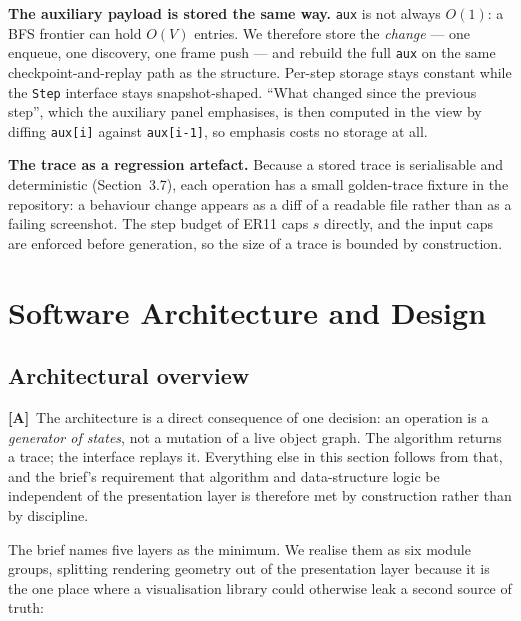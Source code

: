 \documentclass[11pt,a4paper]{article}
\newcommand{\A}{\textcolor{asmc}{\textbf{[A]}}}     %
\newcommand{\ct}[1]{\texttt{#1}}
\begin{document}
\smallskip
\noindent\textbf{The auxiliary payload is stored the same way.} \ct{aux} is not always $O(1)$: a
BFS frontier can hold $O(V)$ entries. We therefore store the \emph{change} --- one enqueue, one
discovery, one frame push --- and rebuild the full \ct{aux} on the same checkpoint-and-replay path
as the structure. Per-step storage stays constant while the \ct{Step} interface stays
snapshot-shaped. ``What changed since the previous step'', which the auxiliary panel emphasises, is
then computed in the view by diffing \ct{aux[i]} against \ct{aux[i-1]}, so emphasis costs no
storage at all.

\smallskip
\noindent\textbf{The trace as a regression artefact.} Because a stored trace is serialisable and
deterministic (Section~3.7), each operation has a small golden-trace fixture in the repository: a
behaviour change appears as a diff of a readable file rather than as a failing screenshot. The step
budget of ER11 caps $s$ directly, and the input caps are enforced before generation, so the size of
a trace is bounded by construction.

\section{Software Architecture and Design}

\subsection{Architectural overview}

\A\ The architecture is a direct consequence of one decision: an operation is a \emph{generator of
states}, not a mutation of a live object graph. The algorithm returns a trace; the interface
replays it. Everything else in this section follows from that, and the brief's requirement that
algorithm and data-structure logic be independent of the presentation layer is therefore met by
construction rather than by discipline.

The brief names five layers as the minimum. We realise them as six module groups, splitting
rendering geometry out of the presentation layer because it is the one place where a visualisation
library could otherwise leak a second source of truth:
\end{document}
